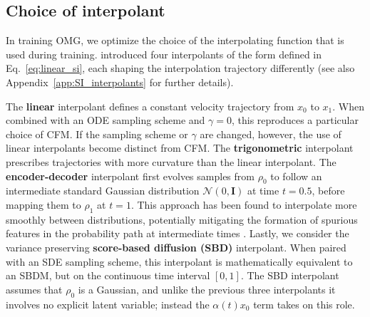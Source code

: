 \subsection{Choice of interpolant}
\label{sec:inter}

In training OMG, we optimize the choice of the interpolating function that is used during training. 
\citet{albergo_stochastic_2023} introduced four interpolants of the form defined in Eq.~\ref{eq:linear_si}, each shaping the interpolation trajectory differently (see also Appendix~\ref{app:SI_interpolants} for further details). 



The \textbf{linear} interpolant defines a constant velocity trajectory from $x_0$ to $x_1$. When combined with an ODE sampling scheme and $\gamma=0$, this reproduces a particular choice of CFM. 
If the sampling scheme or $\gamma$ are changed, however, the use of linear interpolants become distinct from CFM.
The \textbf{trigonometric} interpolant prescribes trajectories with more curvature than the linear interpolant. 
The \textbf{encoder-decoder} interpolant first evolves samples from $\rho_0$ to follow an intermediate standard Gaussian distribution $\mathcal{N}(0,\bm{I})$ at time $t=0.5$, before mapping them to $\rho_1$ at $t=1$.
This approach has been found to interpolate more smoothly between distributions, potentially mitigating the formation of spurious features in the probability path at intermediate times \citep{albergo_stochastic_2023}.
Lastly, we consider the variance preserving \textbf{score-based diffusion (SBD)} interpolant.  When paired with an SDE sampling scheme, this interpolant is mathematically equivalent to an SBDM, but on the continuous time interval $[0,1]$. The SBD interpolant assumes that $\rho_0$ is a Gaussian, and unlike the previous three interpolants it involves no explicit latent variable; instead the $\alpha(t)x_0$ term takes on this role.

